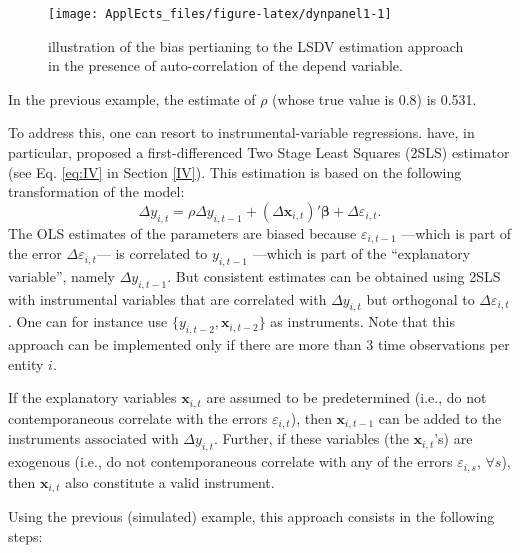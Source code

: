 \documentclass[
  12pt,
]{book}
\theoremstyle{definition}
\theoremstyle{definition}
\theoremstyle{definition}
\theoremstyle{definition}
\theoremstyle{remark}
\begin{document}
\begin{figure}
\texttt{[image: ApplEcts\_files/figure-latex/dynpanel1-1]} \caption{illustration of the bias pertianing to the LSDV estimation approach in the presence of auto-correlation of the depend variable.}\label{fig:dynpanel1}
\end{figure}

In the previous example, the estimate of \(\rho\) (whose true value is 0.8) is 0.531.

To address this, one can resort to instrumental-variable regressions. \citet{Anderson_Hsiao_1982} have, in particular, proposed a first-differenced Two Stage Least Squares (2SLS) estimator (see Eq. \eqref{eq:IV} in Section \ref{IV}). This estimation is based on the following transformation of the model:
\begin{equation}
\Delta y_{i,t} = \rho \Delta y_{i,t-1} + (\Delta \mathbf{x}_{i,t})'\boldsymbol\beta + \Delta\varepsilon_{i,t}.\label{eq:paneldynFisrtDiff}
\end{equation}
The OLS estimates of the parameters are biased because \(\varepsilon_{i,t-1}\) ---which is part of the error \(\Delta\varepsilon_{i,t}\)--- is correlated to \(y_{i,t-1}\) ---which is part of the ``explanatory variable'', namely \(\Delta y_{i,t-1}\). But consistent estimates can be obtained using 2SLS with instrumental variables that are correlated with \(\Delta y_{i,t}\) but orthogonal to \(\Delta\varepsilon_{i,t}\). One can for instance use \(\{y_{i,t-2},\mathbf{x}_{i,t-2}\}\) as instruments. Note that this approach can be implemented only if there are more than 3 time observations per entity \(i\).

If the explanatory variables \(\mathbf{x}_{i,t}\) are assumed to be predetermined (i.e., do not contemporaneous correlate with the errors \(\varepsilon_{i,t}\)), then \(\mathbf{x}_{i,t-1}\) can be added to the instruments associated with \(\Delta y_{i,t}\). Further, if these variables (the \(\mathbf{x}_{i,t}\)'s) are exogenous (i.e., do not contemporaneous correlate with any of the errors \(\varepsilon_{i,s}\), \(\forall s\)), then \(\mathbf{x}_{i,t}\) also constitute a valid instrument.

Using the previous (simulated) example, this approach consists in the following steps:
\end{document}

